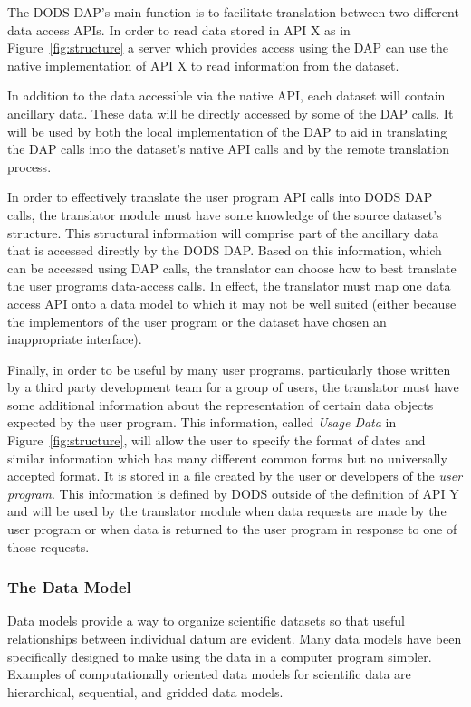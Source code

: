 The DODS DAP's main function is to facilitate translation between two
different data access APIs. In order to read data stored in API X as in
Figure~\ref{fig:structure} a server which provides access using the DAP can
use the native implementation of API X to read information from the dataset.

In addition to the data accessible via the native API, each dataset will
contain ancillary data. These data will be directly accessed by some of the
DAP calls. It will be used by both the local implementation of the DAP to aid
in translating the DAP calls into the dataset's native API calls and by
the remote translation process.

In order to effectively translate the user program API calls into DODS
DAP calls, the translator module must have some knowledge of the
source dataset's structure. This structural information will comprise
part of the ancillary data that is accessed directly by the DODS
DAP\@. Based on this information, which can be accessed using DAP
calls, the translator can choose how to best translate the user
programs data-access calls. In effect, the translator must map one
data access API onto a data model to which it may not be well suited
(either because the implementors of the user program or the dataset
have chosen an inappropriate interface).

Finally, in order to be useful by many user programs, particularly those
written by a third party development team for a group of users, the
translator must have some additional information about the representation of
certain data objects expected by the user program. This information, called
{\em Usage Data\/} in Figure~\ref{fig:structure}, will allow the user to
specify the format of dates and similar information which has many different
common forms but no universally accepted format. It is stored in a file
created by the user or developers of the {\em user program}. This
information is defined by DODS outside of the definition of API Y and will be
used by the translator module when data requests are made by the user program
or when data is returned to the user program in response to one of those
requests.

\subsubsection{The Data Model}

Data models provide a way to organize scientific datasets so that useful
relationships between individual datum are evident. Many data models have
been specifically designed to make using the data in a computer program
simpler. Examples of computationally oriented data models for scientific data
are hierarchical, sequential, and gridded data models. 

